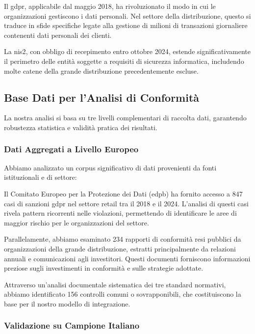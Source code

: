Il \gls{gdpr}, applicabile dal maggio 2018, ha rivoluzionato il modo in cui le organizzazioni gestiscono i dati personali. Nel settore della distribuzione, questo si traduce in sfide specifiche legate alla gestione di milioni di transazioni giornaliere contenenti dati personali dei clienti.

La \gls{nis2}, con obbligo di recepimento entro ottobre 2024, estende significativamente il perimetro delle entità soggette a requisiti di sicurezza informatica, includendo molte catene della grande distribuzione precedentemente escluse.

\subsection{Base Dati per l'Analisi di Conformità}
\label{subsec:4.2.2_base_dati}

La nostra analisi si basa su tre livelli complementari di raccolta dati, garantendo robustezza statistica e validità pratica dei risultati.

\subsubsection{Dati Aggregati a Livello Europeo}

Abbiamo analizzato un corpus significativo di dati provenienti da fonti istituzionali e di settore:

Il Comitato Europeo per la Protezione dei Dati (\gls{edpb}) ha fornito accesso a 847 casi di sanzioni \gls{gdpr} nel settore retail tra il 2018 e il 2024\autocite{EDPB2024}. L'analisi di questi casi rivela pattern ricorrenti nelle violazioni, permettendo di identificare le aree di maggior rischio per le organizzazioni del settore.

Parallelamente, abbiamo esaminato 234 rapporti di conformità resi pubblici da organizzazioni della grande distribuzione, estratti principalmente da relazioni annuali e comunicazioni agli investitori. Questi documenti forniscono informazioni preziose sugli investimenti in conformità e sulle strategie adottate.

Attraverso un'analisi documentale sistematica dei tre standard normativi, abbiamo identificato 156 controlli comuni o sovrapponibili, che costituiscono la base per il nostro modello di integrazione.

\subsubsection{Validazione su Campione Italiano}

